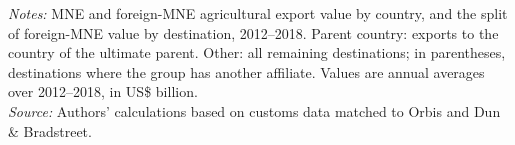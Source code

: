 \documentclass[11pt,a4paper]{article}
\newcommand{\srcnote}{\textit{Source:} Authors' calculations based on customs data matched to Orbis and Dun \& Bradstreet.}
\begin{document}
\begin{table}[H]\centering\small%
  \caption{Multinational Agricultural Exports by Exporting Country and Destination Type}%
  \label{tab:ap_pres}%
  \par\vspace{3pt}%
  \begin{minipage}{0.95\textwidth}\footnotesize %
  \textit{Notes:} MNE and foreign-MNE agricultural export value by country, and the split of foreign-MNE value by destination, 2012--2018. Parent country: exports to the country of the ultimate parent. Other: all remaining destinations; in parentheses, destinations where the group has another affiliate. Values are annual averages over 2012--2018, in US\$ billion.\\[3pt]%
  \srcnote%
  \end{minipage}%
  \end{table}
\end{document}
